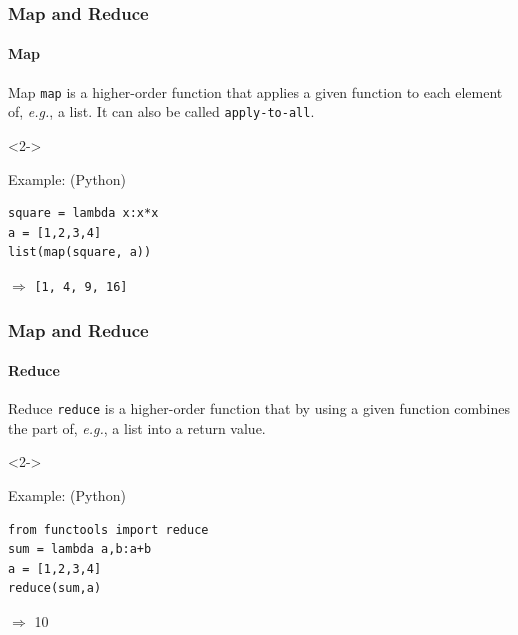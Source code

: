 \documentclass[aspectratio=169,usenames,dvipsnames]{beamer}
\begin{document}
    \begin{frame}[fragile]
        \frametitle{Map and Reduce}
        \framesubtitle{Map}

            \begin{block}{Map}
                \texttt{map} is a higher-order function that applies a given
                function to each element of, \textit{e.g.}, a list. It can also
                be called \texttt{apply-to-all}.
            \end{block}
            \begin{uncoverenv}<2->
            \begin{block}{Example: \hfill \small(Python)}
            \begin{center}
            \begin{minipage}{0.8\linewidth}
            \begin{lstlisting}
square = lambda x:x*x
a = [1,2,3,4]
list(map(square, a))
            \end{lstlisting}
            $\Rightarrow$ \texttt{[1, 4, 9, 16]}
            \end{minipage}
            \end{center}
            \end{block}
            \end{uncoverenv}
        
    \end{frame}
    
    \begin{frame}[fragile]
        \frametitle{Map and Reduce}
        \framesubtitle{Reduce}

            \begin{block}{Reduce}
                \texttt{reduce} is a higher-order function that by using a
                given function combines the part of, \textit{e.g.}, a list into
                a return value.
            \end{block}
            \begin{uncoverenv}<2->
            \begin{block}{Example: \hfill \small(Python)}
            \begin{center}
            \begin{minipage}{0.8\linewidth}
            \begin{lstlisting}
from functools import reduce
sum = lambda a,b:a+b
a = [1,2,3,4]
reduce(sum,a)
            \end{lstlisting}
            $\Rightarrow$ 10
            \end{minipage}
            \end{center}
            \end{block}
            \end{uncoverenv}
    \end{frame}
\end{document}

